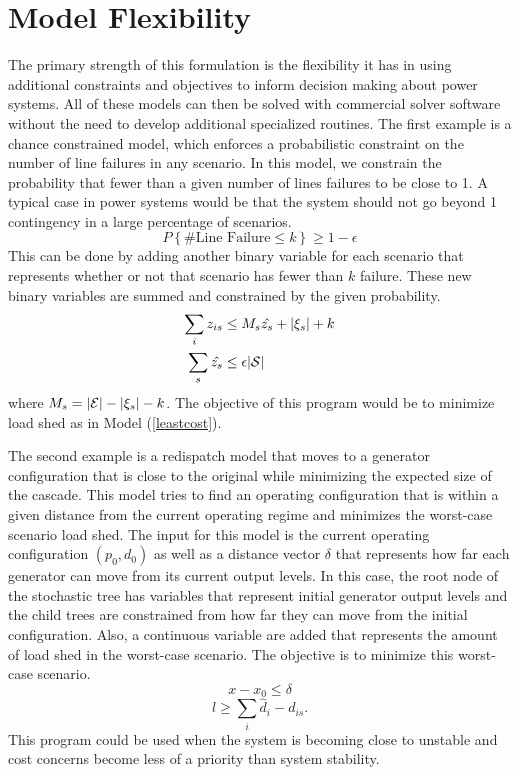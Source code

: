 \section{Model Flexibility}
The primary strength of this formulation is the flexibility it has in using additional constraints and objectives to inform decision making about power systems.  All of these models can then be solved with commercial solver software without the need to develop additional specialized routines.  The first example is a chance constrained model, which enforces a probabilistic constraint on the number of line failures in any scenario. 
In this model, we constrain the probability that fewer than a given number of lines failures to be close to 1.  A typical case in power systems would be that the system should not go beyond 1 contingency in a large percentage of scenarios.
\begin{equation}
P\left\{\text{\# Line Failure} \le k \right\} \ge 1 - \epsilon
\end{equation}
This can be done by adding another binary variable for each scenario that represents whether or not that scenario has fewer than $k$ failure.  These new binary variables are summed and constrained by the given probability.
\begin{subequations}
\begin{align}
\sum_i z_{is} &\le	M_s \hat{z_s} + | \xi_s | + k \\
\sum_s \hat{z_s} &\le \epsilon | \mathcal{S} |
\end{align}
\end{subequations}
where $M_s = | \mathcal{E} | - | \xi_s | - k$.  The objective of this program would be to minimize load shed as in Model (\ref{leastcost}).


The second example is a redispatch model that moves to a generator configuration that is close to the original while minimizing the expected size of the cascade.
This model tries to find an operating configuration that is within a given distance from the current operating regime and minimizes the worst-case scenario load shed.  The input for this model is the current operating configuration $(p_0, d_0)$ as well as a distance vector $\delta$ that represents how far each generator can move from its current output levels.  In this case, the root node of the stochastic tree has variables that represent initial generator output levels and the child trees are constrained from how far they can move from the initial configuration.  Also, a continuous variable are added that represents the amount of load shed in the worst-case scenario.  The objective is to minimize this worst-case scenario.  
\begin{equation}
x - x_0 \le \delta
\end{equation}
\begin{equation}
l \ge \sum_i \hat{d}_i - d_{is}.
\end{equation}
This program could be used when the system is becoming close to unstable and cost concerns become less of a priority than system stability.


